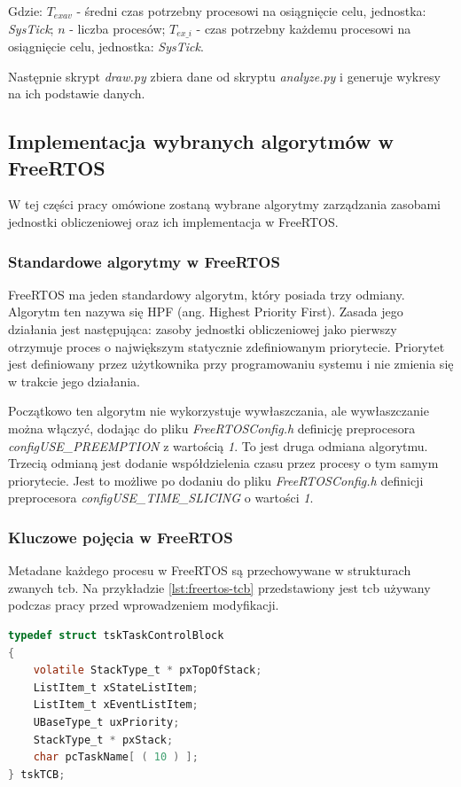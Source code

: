 \documentclass[../../main]{subfiles}
\begin{document}
Gdzie: $T_{exav}$ - średni czas potrzebny procesowi na osiągnięcie celu, jednostka: \textit{SysTick}; $n$ - liczba procesów;  $T_{ex\_i}$ - czas potrzebny każdemu procesowi na osiągnięcie celu, jednostka: \textit{SysTick}.

Następnie skrypt \textit{draw.py} zbiera dane od skryptu \textit{analyze.py} i generuje wykresy na ich podstawie danych.

\subsection{Implementacja wybranych algorytmów w FreeRTOS}

W tej części pracy omówione zostaną wybrane algorytmy zarządzania zasobami jednostki obliczeniowej oraz ich implementacja w FreeRTOS.

\subsubsection{Standardowe algorytmy w FreeRTOS}

FreeRTOS ma jeden standardowy algorytm, który posiada trzy odmiany. Algorytm ten nazywa się HPF (ang. Highest Priority First). Zasada jego działania jest następująca: zasoby jednostki obliczeniowej jako pierwszy otrzymuje proces o największym statycznie zdefiniowanym priorytecie. Priorytet jest definiowany przez użytkownika przy programowaniu systemu i nie zmienia się w trakcie jego działania.

Początkowo ten algorytm nie wykorzystuje wywłaszczania, ale wywłaszczanie można włączyć, dodając do pliku \textit{FreeRTOSConfig.h} definicję preprocesora \textit{configUSE\_PREEMPTION} z wartością \textit{1}. To jest druga odmiana algorytmu. Trzecią odmianą jest dodanie współdzielenia czasu przez procesy o tym samym priorytecie. Jest to możliwe po dodaniu do pliku \textit{FreeRTOSConfig.h} definicji preprocesora \textit{configUSE\_TIME\_SLICING} o wartości \textit{1}.

\subsubsection{Kluczowe pojęcia w FreeRTOS}

Metadane każdego procesu w FreeRTOS są przechowywane w strukturach zwanych \gls{tcb}. Na przykładzie \ref{lst:freertos-tcb} przedstawiony jest \gls{tcb} używany podczas pracy przed wprowadzeniem modyfikacji.

\begin{lstlisting}[language=C, label={lst:freertos-tcb}, caption={Przykładowy TCB przed zmianami}]
typedef struct tskTaskControlBlock
{
    volatile StackType_t * pxTopOfStack;
    ListItem_t xStateListItem;
    ListItem_t xEventListItem;
    UBaseType_t uxPriority;
    StackType_t * pxStack;
    char pcTaskName[ ( 10 ) ];
} tskTCB;
\end{lstlisting}
\end{document}
